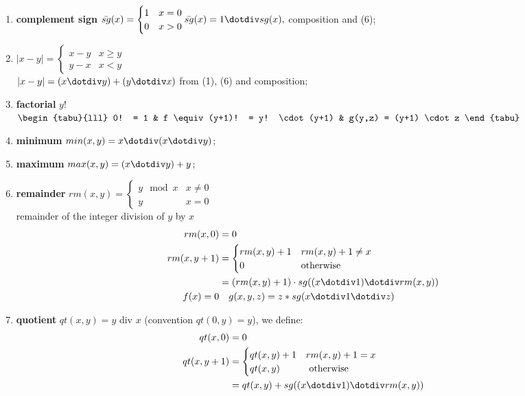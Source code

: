\begin{observation}
\begin{enumerate}
\item \textbf{complement sign} $\bar{sg}(x) = \begin{cases}
    1 & x=0 \\
    0 & x>0
  \end{cases}\\
  \bar{sg}(x) = 1 \dotdiv  sg(x), $ composition and (6);
\item $ |x - y| = \begin{cases}
    x-y & x\geq y \\
    y-x & x < y
  \end{cases}$\\
  $ |x - y| = (x\dotdiv y)+(y\dotdiv x)$ from (1), (6) and composition;
\item \textbf{factorial} $y!$\\
$\begin{tabu}{lll}
  0! = 1 & f \equiv (y+1)! = y! \cdot (y+1) & g(y,z) = (y+1) \cdot z
\end{tabu}$
\item \textbf{minimum} $min(x,y) = x\dotdiv  (x\dotdiv  y)$;
\item \textbf{maximum} $max(x,y) = (x \dotdiv  y) + y$;
\item \textbf{remainder} $rm(x,y) = \begin{cases}
    y \mod x & x \not= 0 \\
    y       & x=0
  \end{cases}$ \\ 
  remainder of the integer division of $y$ by $x$ 
  \begin{align*}
    rm(x,0) &= 0\\
    rm(x,y+1) &= \begin{cases}
      rm(x,y)+1 & rm(x,y)+1 \not= x \\
      0         & $otherwise$
    \end{cases}\\
    &= (rm(x,y)+1)  \cdot sg((x\dotdiv  1)\dotdiv  rm(x,y))\\
    f(x) = 0 &\quad  g(x,y,z) = z * sg(x\dotdiv 1\dotdiv z)
  \end{align*}
  
\item \textbf{quotient} $qt(x,y) = y$ div $x$ (convention $qt(0,y) = y$),
  we define:
  \begin{align*}
    qt(x,0) &= 0\\
    qt(x,y+1) &= \begin{cases}
      qt(x,y)+1 & rm(x,y)+1=x  \\
      qt(x,y)   & $ otherwise$
    \end{cases}\\
    &= qt(x,y) + sg((x\dotdiv 1)\dotdiv rm(x,y))
  \end{align*}



\end{enumerate}
\end{observation}
